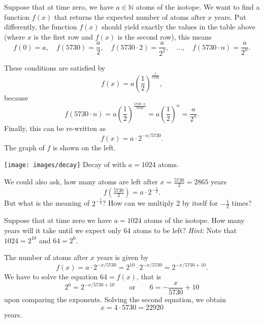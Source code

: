 Suppose that at time zero, we have $a\in\mathbb N$ atoms of the  isotope.
We want to find a function $f\left(x\right)$ that returns the expected number of  atoms after $x$ years.
Put differently, the function $f\left(x\right)$ should yield exactly the values in the table above (where $x$ is the first row and $f\left(x\right)$ is the second row), this means
\begin{equation*}
	f\left(0\right)=a,\quad
	f\left(5730\right)=\frac{a}{2},\quad
	f\left(5730\cdot 2\right)=\frac{a}{2^2},\quad\ldots,\quad
	f\left(5730\cdot n\right)=\frac{a}{2^n}.
\end{equation*}
\begin{minipage}{0.48\textwidth}
	These conditions are satisfied by
	\begin{equation*}
		f\left(x\right)=a\left(\frac{1}{2}\right)^{\tfrac{x}{5730}},
	\end{equation*}
	because
	\begin{equation*}
		f\left(5730\cdot n\right)=a\left(\frac{1}{2}\right)^{\tfrac{5730\cdot n}{5730}}
		=a\left(\frac{1}{2}\right)^n
		=\frac{a}{2^n}.
	\end{equation*}
	Finally, this can be re-written as
	\begin{equation*}
		f\left(x\right)=a\cdot 2^{-x/5730}.
	\end{equation*}
	The graph of $f$ is shown on the left.
\end{minipage}\hfill
\begin{minipage}{0.48\textwidth}
		\centering
		\texttt{[image: images/decay]}\hfill
		Decay of  with $a=1024$ atoms.
\end{minipage}
	We could also ask, how many  atoms are left after $x=\frac{5730}{2}=2865$ years
\begin{equation*}
	f\left(\tfrac{5730}{2}\right)=a\cdot 2^{-\frac{1}{2}}.
\end{equation*}
But what is the meaning of $2^{-\frac{1}{2}}$?
How can we multiply 2 by itself for $-\frac{1}{2}$ times?
\begin{exercise} \label{ex:c14}
	Suppose that at time zero we have $a=1024$ atoms of the  isotope.
	How many years will it take until we expect only $64$ atoms to be left?
	\textit{Hint:} Note that $1024=2^{10}$ and $64=2^6$.
\end{exercise}
\begin{solution*}
	The number of  atoms after $x$ years is given by
	\begin{equation*}
		f\left(x\right)=a\cdot 2^{-x/5730}=2^{10}\cdot 2^{-x/5730}=2^{-x/5730+10}.
	\end{equation*}
	We have to solve the equation $64=f\left(x\right)$, that is
	\begin{equation*}
		2^6=2^{-x/5730+10}\qquad\text{or}\qquad 6=-\frac{x}{5730}+10
	\end{equation*}
	upon comparing the exponents.
	Solving the second equation, we obtain
	\begin{equation*}
		x=4\cdot 5730=22920
	\end{equation*}
	years.
\end{solution*}
